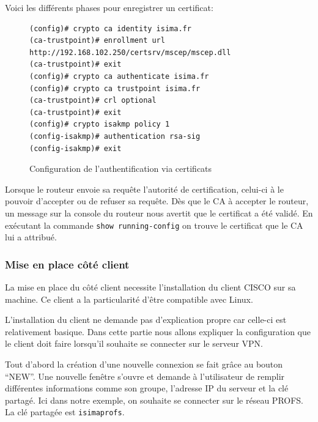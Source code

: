 Voici les différents phases pour enregistrer un certificat:


\begin{figure}[H]
	\begin{center}
		\begin{minipage}{1\textwidth}
			\begin{lstlisting}[frame=trBL]
(config)# crypto ca identity isima.fr
(ca-trustpoint)# enrollment url
http://192.168.102.250/certsrv/mscep/mscep.dll
(ca-trustpoint)# exit
(config)# crypto ca authenticate isima.fr
(config)# crypto ca trustpoint isima.fr
(ca-trustpoint)# crl optional
(ca-trustpoint)# exit
(config)# crypto isakmp policy 1
(config-isakmp)# authentication rsa-sig
(config-isakmp)# exit
			\end{lstlisting}
		\end{minipage}
	\end{center}
	\caption{Configuration de l'authentification via certificats}
	\label{configuration_authentification_certificats}
\end{figure}

Lorsque le routeur envoie sa requête l'autorité de certification, celui-ci à le pouvoir d'accepter ou de refuser sa requête. Dès que le CA à accepter le routeur, un message sur la console du routeur nous avertit que le certificat a été validé. En exécutant la commande \verb|show running-config| on trouve le certificat que le CA lui a attribué.


\subsubsection{Mise en place côté client}

La mise en place du côté client necessite l'installation du client CISCO sur sa machine. Ce client a la particularité d'être compatible avec Linux.

L'installation du client ne demande pas d'explication propre car celle-ci est relativement basique. Dans cette partie nous allons expliquer la configuration que le client doit faire lorsqu'il souhaite se connecter sur le serveur VPN.

Tout d'abord la création d'une nouvelle connexion se fait grâce au bouton ``NEW''. Une nouvelle fenêtre s'ouvre et demande à l'utilisateur de remplir différentes informations comme son groupe, l'adresse IP du serveur et la clé partagé. Ici dans notre exemple, on souhaite se connecter sur le réseau PROFS. La clé partagée est \verb|isimaprofs|.

